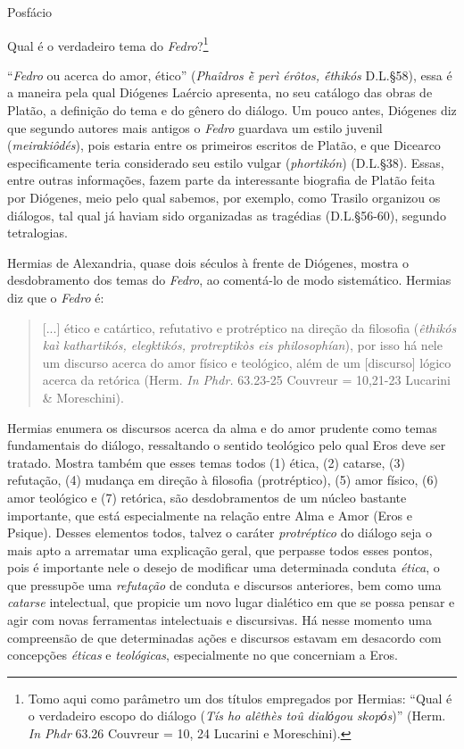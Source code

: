 Posfácio

Qual é o verdadeiro tema do \emph{Fedro}?\footnote{Tomo aqui como
  parâmetro um dos títulos empregados por Hermias: ``Qual é o verdadeiro
  escopo do diálogo (\emph{Tís ho alêthès toû dialόgou skopόs})'' (Herm.
  \emph{In Phdr} 63.26 Couvreur = 10, 24 Lucarini e Moreschini).}

``\emph{Fedro} ou acerca do amor, ético'' (\emph{Phaîdros ḕ perì érôtos,
ḗthikós} D.L.§58), essa é a maneira pela qual Diógenes Laércio
apresenta, no seu catálogo das obras de Platão, a definição do tema e do
gênero do diálogo. Um pouco antes, Diógenes diz que segundo autores mais
antigos o \emph{Fedro} guardava um estilo juvenil (\emph{meirakiôdés}),
pois estaria entre os primeiros escritos de Platão, e que Dicearco
especificamente teria considerado seu estilo vulgar (\emph{phortikón})
(D.L.§38). Essas, entre outras informações, fazem parte da interessante
biografia de Platão feita por Diógenes, meio pelo qual sabemos, por
exemplo, como Trasilo organizou os diálogos, tal qual já haviam sido
organizadas as tragédias (D.L.§56-60), segundo tetralogias.

Hermias de Alexandria, quase dois séculos à frente de Diógenes, mostra o
desdobramento dos temas do \emph{Fedro}, ao comentá-lo de modo
sistemático. Hermias diz que o \emph{Fedro} é:

\begin{quote}
{[}...{]} ético e catártico, refutativo e protréptico na direção da
filosofia (\emph{êthikós kaì kathartikós, elegktikós, protreptikòs eis
philosophían}), por isso há nele um discurso acerca do amor físico e
teológico, além de um {[}discurso{]} lógico acerca da retórica (Herm.
\emph{In Phdr.} 63.23-25 Couvreur = 10,21-23 Lucarini \& Moreschini).
\end{quote}

Hermias enumera os discursos acerca da alma e do amor prudente como
temas fundamentais do diálogo, ressaltando o sentido teológico pelo qual
Eros deve ser tratado. Mostra também que esses temas todos (1) ética,
(2) catarse, (3) refutação, (4) mudança em direção à filosofia
(protréptico), (5) amor físico, (6) amor teológico e (7) retórica, são
desdobramentos de um núcleo bastante importante, que está especialmente
na relação entre Alma e Amor (Eros e Psique). Desses elementos todos,
talvez o caráter \emph{protréptico} do diálogo seja o mais apto a
arrematar uma explicação geral, que perpasse todos esses pontos, pois é
importante nele o desejo de modificar uma determinada conduta
\emph{ética}, o que pressupõe uma \emph{refutação} de conduta e
discursos anteriores, bem como uma \emph{catarse} intelectual, que
propicie um novo lugar dialético em que se possa pensar e agir com novas
ferramentas intelectuais e discursivas. Há nesse momento uma compreensão
de que determinadas ações e discursos estavam em desacordo com
concepções \emph{éticas} e \emph{teológicas}, especialmente no que
concerniam a Eros.

